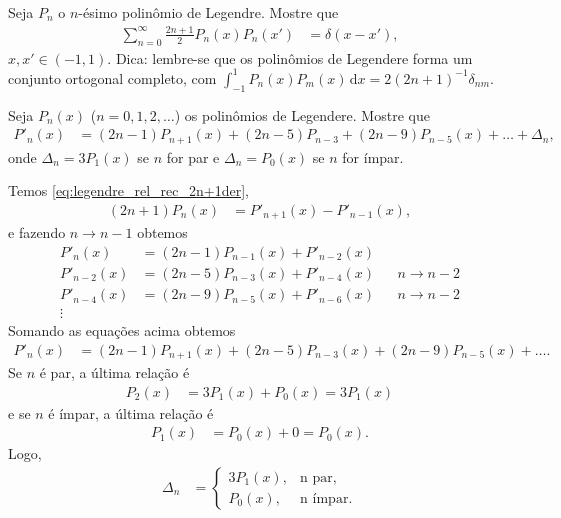 \documentclass[a4paper,12pt, leqno, answers]{exam}
\begin{document}
\begin{questions}
\begin{solution}
    \end{solution}

    \question[E de 2010] Seja $P_n$ o $n$-\'{e}simo polin\^{o}mio de Legendre. Mostre que
    \begin{align*}
        \sum_{n = 0}^\infty \frac{2n + 1}{2} P_n(x) P_n(x') &= \delta(x - x'),
    \end{align*}
    $x, x' \in (-1, 1)$. Dica: lembre-se que os polin\^{o}mios de Legendere forma um conjunto ortogonal completo, com $\int_{-1}^1 P_n(x) P_m(x) \,\mathrm{d}x = 2 (2 n + 1)^{-1} \delta_{nm}$.
    \begin{solution}
        
    \end{solution}

    \question[T6 de 2011] Seja $P_n(x)$ ($n = 0, 1, 2, \ldots$) os polin\^{o}mios de Legendere. Mostre que
    \begin{align*}
        P'_n(x) &= (2n - 1) P_{n + 1}(x) + (2n - 5) P_{n - 3} + (2n - 9) P_{n - 5}(x) + \ldots + \Delta_n,
    \end{align*}
    onde $\Delta_n = 3 P_1(x)$ se $n$ for par e $\Delta_n = P_0(x)$ se $n$ for \'{i}mpar.
    \begin{solution}
        Temos \eqref{eq:legendre_rel_rec_2n+1der}, 
        \begin{align*}
            (2n + 1) P_n(x) &= P'_{n + 1}(x) - P'_{n - 1}(x),
        \end{align*}
        e fazendo $n \to n - 1$ obtemos
        \begin{align*}
            P'_n(x) &= (2n - 1) P_{n - 1}(x) + P'_{n - 2}(x) \\
            P'_{n - 2}(x) &= (2n - 5) P_{n - 3}(x) + P'_{n - 4}(x) && n \to n - 2 \\
            P'_{n - 4}(x) &= (2n - 9) P_{n - 5} (x)+ P'_{n - 6}(x) && n \to n - 2 \\
            \vdots
        \end{align*}
        Somando as equa\c{c}\~{o}es acima obtemos
        \begin{align*}
            P'_n(x) &= (2n - 1) P_{n + 1}(x) + (2n - 5) P_{n - 3}(x) + (2n - 9) P_{n - 5}(x) + \ldots.
        \end{align*}
        Se $n$ \'{e} par, a \'{u}ltima rela\c{c}\~{a}o \'{e}
        \begin{align*}
            P_2(x) &= 3 P_1(x) + P_0(x) = 3 P_1(x)
        \end{align*}
        e se $n$ \'{e} \'{i}mpar, a \'{u}ltima rela\c{c}\~{a}o \'{e}
        \begin{align*}
            P_1(x) &= P_0(x) + 0 = P_0(x).
        \end{align*}
        Logo,
        \begin{align*}
            \Delta_n &= \begin{cases}
                3 P_1(x), & \text{n par}, \\
                P_0(x), & \text{n \'{i}mpar}.
            \end{cases}
        \end{align*}
    \end{solution}


\end{questions}
\end{document}

